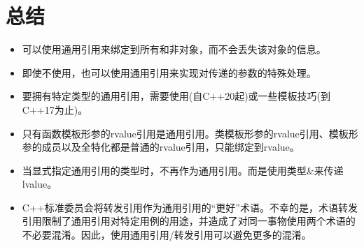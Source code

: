 \section{总结}
\begin{itemize}
	\item 可以使用通用引用来绑定到所有和非对象，而不会丢失该对象的信息。
	\item 即使不使用，也可以使用通用引用来实现对传递的参数的特殊处理。
	\item 要拥有特定类型的通用引用，需要使用(自C++20起)或一些模板技巧(到C++17为止)。
	\item 只有函数模板形参的rvalue引用是通用引用。类模板形参的rvalue引用、模板形参的成员以及全特化都是普通的rvalue引用，只能绑定到rvalue。
	\item 当显式指定通用引用的类型时，不再作为通用引用。而是使用类型\&来传递lvalue。
	\item C++标准委员会将转发引用作为通用引用的“更好”术语。不幸的是，术语转发引用限制了通用引用对特定用例的用途，并造成了对同一事物使用两个术语的不必要混淆。因此，使用通用引用/转发引用可以避免更多的混淆。
\end{itemize}


